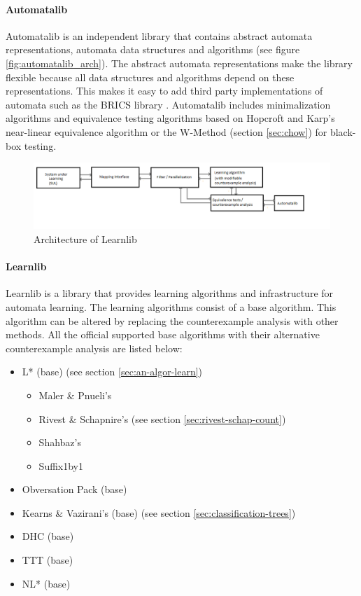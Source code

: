 \documentclass[multi,crop=false,class=article]{standalone}
\begin{document}
\paragraph{Automatalib} Automatalib is an independent library that contains 
abstract automata representations, automata data structures and algorithms (see 
figure \ref{fig:automatalib_arch}). The 
abstract automata representations make the library flexible because all data 
structures and algorithms depend on these representations. This makes it easy 
to add third party implementations of automata such as the BRICS library 
\cite{Alur2005}. Automatalib includes minimalization algorithms and equivalence 
testing algorithms based on Hopcroft and Karp's near-linear equivalence 
algorithm \cite{Hopcroft1971} or the W-Method (section \ref{sec:chow}) for 
black-box testing.

\begin{figure}[!ht]
	\includegraphics[width=\textwidth]{Tool_images/learnlib_architecture.png}
	\caption{Architecture of Learnlib}
	\label{fig:learnlib_arch}
\end{figure}

\paragraph{Learnlib} Learnlib is a library that provides learning algorithms and
infrastructure for automata learning. The learning algorithms consist of a base 
algorithm. This algorithm can be altered by replacing the counterexample 
analysis with other methods. All the official supported base algorithms with 
their alternative counterexample analysis are listed below:

\begin{itemize}
	\item L* (base) (see section \ref{sec:an-algor-learn})
	\begin{itemize}
		\item Maler \& Pnueli's \cite{Maler1995}
		\item Rivest \& Schapnire's (see section \ref{sec:rivest-schap-count})
		\item Shahbaz's \cite{Shahbaz2009}
		\item Suffix1by1 \cite{Irfan2010}
	\end{itemize}
	\item Obversation Pack (base) \cite{Howar2012a}
	\item Kearns \& Vazirani's (base) (see section 
	\ref{sec:classification-trees})
	\item DHC (base) \cite{Merten2012}
	\item TTT (base) 
	\item NL* (base) \cite{Bollig2009}
\end{itemize}
\end{document}
